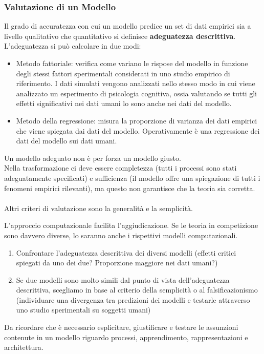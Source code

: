 \subsubsection{Valutazione di un Modello}
Il grado di accuratezza con cui un modello predice un set di dati empirici sia a livello qualitativo che quantitativo si definisce \textbf{adeguatezza descrittiva}.
L'adeguatezza si può calcolare in due modi:
\begin{itemize}
    \item Metodo fattoriale: verifica come variano le rispose del modello in funzione degli stessi fattori sperimentali considerati in uno studio empirico di riferimento. I dati simulati vengono analizzati nello stesso modo in cui viene analizzato un esperimento di psicologia cognitiva, ossia valutando se tutti gli effetti significativi nei dati umani lo sono anche nei dati del modello.
    \item Metodo della regressione: misura la proporzione di varianza dei dati empirici che viene spiegata dai dati del modello. Operativamente è una regressione dei dati del modello sui dati umani.
\end{itemize}
Un modello adeguato non è per forza un modello giusto.\\
Nella trasformazione ci deve essere completezza (tutti i processi sono stati adeguatamente specificati) e sufficienza (il modello offre una spiegazione di tutti i fenomeni empirici rilevanti), ma questo non garantisce che la teoria sia corretta.\\\\
Altri criteri di valutazione sono la generalità e la semplicità.

L'approccio computazionale facilita l'aggiudicazione. Se le teoria in competizione sono davvero diverse, lo saranno anche i rispettivi modelli computazionali.
\begin{enumerate}
    \item Confrontare l'adeguatezza descrittiva dei diversi modelli (effetti critici spiegati da uno dei due? Proporzione maggiore nei dati umani?)
    \item Se due modelli sono molto simili dal punto di vista dell'adeguatezza descrittiva, scegliamo in base al criterio della semplicità o al falsificazionismo (individuare una divergenza tra predizioni dei modelli e testarle attraverso uno studio sperimentali su soggetti umani)
\end{enumerate}

Da ricordare che è necessario esplicitare, giustificare e testare le assunzioni contenute in un modello riguardo processi, apprendimento, rappresentazioni e architettura.

